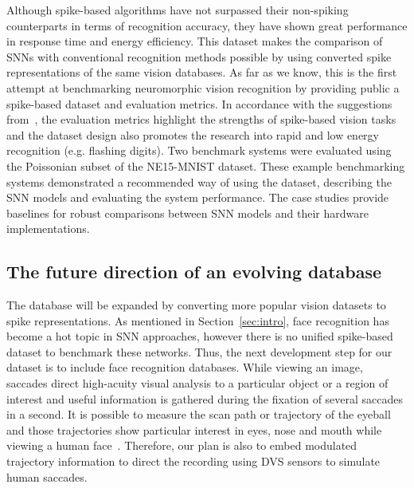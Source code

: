 Although spike-based algorithms have not surpassed their non-spiking counterparts in terms of recognition accuracy, they have shown great performance in response time and energy efficiency.
This dataset makes the comparison of SNNs with conventional recognition methods possible by using converted spike representations of the same vision databases.
As far as we know, this is the first attempt at benchmarking neuromorphic vision recognition by providing public a spike-based dataset and evaluation metrics.
In accordance with the suggestions from~\cite{tan2015bench}, the evaluation metrics highlight the strengths of spike-based vision tasks and the dataset design also promotes the research into rapid and low energy recognition (e.g. flashing digits).
Two benchmark systems were evaluated using the Poissonian subset of the NE15-MNIST dataset.
These example benchmarking systems demonstrated a recommended way of using the dataset, describing the SNN models and evaluating the system performance.
The case studies provide baselines for robust comparisons between SNN models and their hardware implementations.

\subsection{The future direction of an evolving database}
The database will be expanded by converting more popular vision datasets to spike representations.
As mentioned in Section~\ref{sec:intro}, face recognition has become a hot topic in SNN approaches, however there is no unified spike-based dataset to benchmark these networks.
Thus, the next development step for our dataset is to include face recognition databases.
While viewing an image, saccades direct high-acuity visual analysis to a particular object or a region of interest and useful information is gathered during the fixation of several saccades in a second.
It is possible to measure the scan path or trajectory of the eyeball and those trajectories show particular interest in eyes, nose and mouth while viewing a human face~\cite{yarbus1967eye}.
Therefore, our plan is also to embed modulated trajectory information to direct the recording using DVS sensors to simulate human saccades.

